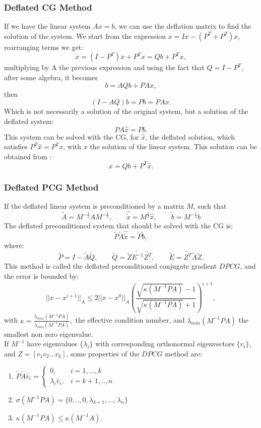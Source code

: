 \documentclass[a4paper,10pt]{report}
\begin{document}
\subsubsection{Deflated CG Method}
If we have the linear system $Ax=b$, we can use the deflation matrix to find the solution of the system. We start from 
the expression $x=Ix-(P^{T}+P^{T})x$, rearranging terms we get:
$$x=(I-P^T)x+P^Tx=Qb+P^Tx, $$
multiplying by A the previous expression and using the fact that $Q=I-P^{T}$, after some algebra, it becomes
$$b=AQb+PAx,$$
then
$$(I-AQ)b=Pb=PAx.$$
Which is not necessarily a solution of the original system, but a solution of the deflated system:
$$PA\hat{x}=Pb.$$
This system can be solved with the CG, for $\hat{x}$, the deflated solution, which satisfies $P^T\hat{x}=P^Tx$, with $x$ the solution of the linear system.
This solution can be obtained from \cite{Tang08}:
$$x=Qb+P^T\hat{x}.$$

\subsubsection{Deflated PCG Method}
If the deflated linear system is preconditioned by a matrix $M$, such that
\begin{equation*}
 \tilde{A}=M^{-\frac{1}{2}}AM^{-\frac{1}{2}}, \qquad \hat{\tilde{x}}=M^{\frac{1}{2}}\hat{x}, \qquad
 \tilde{b}=M^{-\frac{1}{2}}b
\end{equation*}
The deflated preconditioned system that should be solved with the CG is:
$$\tilde{P} \tilde{A} \hat{\tilde{x}}=\tilde{P}\tilde{b},$$
where:
\begin{equation*}
 \tilde{P}=I-\tilde{A}\tilde{Q}, \qquad \tilde{Q}=\tilde{Z}\tilde{E^{-1}}\tilde{Z^T}, \qquad
 \tilde{E}=\tilde{Z^T}\tilde{A}\tilde{Z}.
\end{equation*}
This method is called the deflated preconditioned conjugate gradient $DPCG$, and the error is bounded by:
\begin{equation*}
 ||x-x^{i+1}||_A\leq 2||x-x^{0}||_A \left( \frac{\sqrt{\kappa(M^{-1}PA)}-1}{\sqrt{\kappa(M^{-1}PA)}+1} \right)^{i+1},
\end{equation*}
with $\kappa=\frac{\lambda_{max}(M^{-1}PA)}{\lambda_{min}(M^{-1}PA)},$ the effective condition number, and $\lambda_{min}(M^{-1}PA)$ the smallest non zero eigenvalue.\\
If $M^{-1}$ have eigenvalues $\{\lambda_i\}$ with corresponding orthonormal eigenvectors
 $\{v_i\}$, and $Z={[ v_{1} v_{2}... v_{k}]}$, some properties of the $DPCG$ method are:
\begin{enumerate}
 \item  $\tilde{P} \tilde{A} \tilde{v_i}= \begin{cases} 0, & i=1,...,k\\ \lambda_i\tilde{v_i}, & i=k+1,..,n \end{cases}$
 \item $\sigma(M^{-1}PA)=\{0,..,0,\lambda_{k+1},...,\lambda_n\}$
 \item $\kappa(M^{-1}PA) \leq \kappa(M^{-1}A).$
 \end{enumerate}
\end{document}
